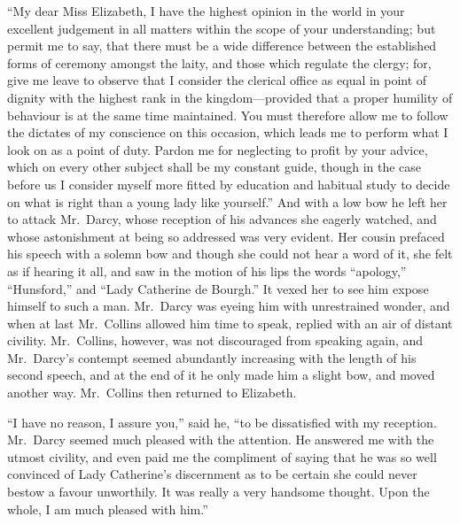 \documentclass[12pt,english,oneside]{book}
\begin{document}
{}``My dear Miss Elizabeth, I have the highest opinion in the world
in your excellent judgement in all matters within the scope of your
understanding; but permit me to say, that there must be a wide difference
between the established forms of ceremony amongst the laity, and those
which regulate the clergy; for, give me leave to observe that I consider
the clerical office as equal in point of dignity with the highest
rank in the kingdom\mbox{---}provided that a proper humility of behaviour
is at the same time maintained. You must therefore allow me to follow
the dictates of my conscience on this occasion, which leads me to
perform what I look on as a point of duty. Pardon me for neglecting
to profit by your advice, which on every other subject shall be my
constant guide, though in the case before us I consider myself more
fitted by education and habitual study to decide on what is right
than a young lady like yourself.'' And with a low bow he left her
to attack Mr.\ Darcy, whose reception of his advances she eagerly
watched, and whose astonishment at being so addressed was very evident.
Her cousin prefaced his speech with a solemn bow and though she could
not hear a word of it, she felt as if hearing it all, and saw in the
motion of his lips the words {}``apology,'' {}``Hunsford,'' and
{}``Lady Catherine de Bourgh.'' It vexed her to see him expose himself
to such a man. Mr.\ Darcy was eyeing him with unrestrained wonder,
and when at last Mr.\ Collins allowed him time to speak, replied
with an air of distant civility. Mr.\ Collins, however, was not discouraged
from speaking again, and Mr.\ Darcy's contempt seemed abundantly
increasing with the length of his second speech, and at the end of
it he only made him a slight bow, and moved another way. Mr.\ Collins
then returned to Elizabeth.

{}``I have no reason, I assure you,'' said he, {}``to be dissatisfied
with my reception. Mr.\ Darcy seemed much pleased with the attention.
He answered me with the utmost civility, and even paid me the compliment
of saying that he was so well convinced of Lady Catherine's discernment
as to be certain she could never bestow a favour unworthily. It was
really a very handsome thought. Upon the whole, I am much pleased
with him.''
\end{document}
